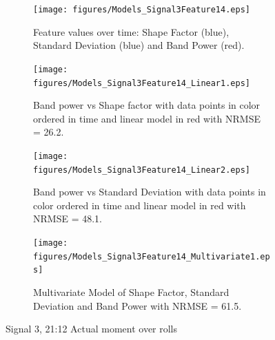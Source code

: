 \documentclass[]{article}
\begin{document}
\begin{figure}[H]
	\captionsetup[subfigure]{}
    \centering
		\begin{subfigure}{.45\textwidth}
		  \centering
    			\texttt{[image: figures/Models\_Signal3Feature14.eps]}
		  	\caption{Feature values over time: Shape Factor (blue), Standard Deviation (blue) and Band Power (red).}
		  	\label{fig:Models_Signal3Feature14}
		\end{subfigure}\hspace{\fill}%
		\begin{subfigure}{.45\textwidth}
		  \centering
 		   	\texttt{[image: figures/Models\_Signal3Feature14\_Linear1.eps]}
		  	\caption{Band power vs Shape factor with data points in color ordered in time and linear model in red with \gls{NRMSE} = 26.2.}
		  	\label{fig:Models_Signal3Feature14_Linear1}
		\end{subfigure}
		\bigskip
		\begin{subfigure}{.45\textwidth}
		  \centering
    			\texttt{[image: figures/Models\_Signal3Feature14\_Linear2.eps]}
		  	\caption{Band power vs Standard Deviation with data points in color ordered in time and linear model in red with \gls{NRMSE} = 48.1.}
		  	\label{fig:Models_Signal3Feature14_Linear2}
		\end{subfigure}\hspace{\fill}%
		\begin{subfigure}{.45\textwidth}
		  \centering
 		   	\texttt{[image: figures/Models\_Signal3Feature14\_Multivariate1.eps]}
		  	\caption{Multivariate Model of Shape Factor, Standard Deviation and Band Power with \gls{NRMSE} = 61.5.}
		  	\label{fig:Models_Signal3Feature14_Multivariate1}
		\end{subfigure}
    \caption{Signal 3, 21:12 Actual moment over rolls}
    \label{fig:Models_Signal3Feature14_Caption}
\end{figure}



\end{document}
